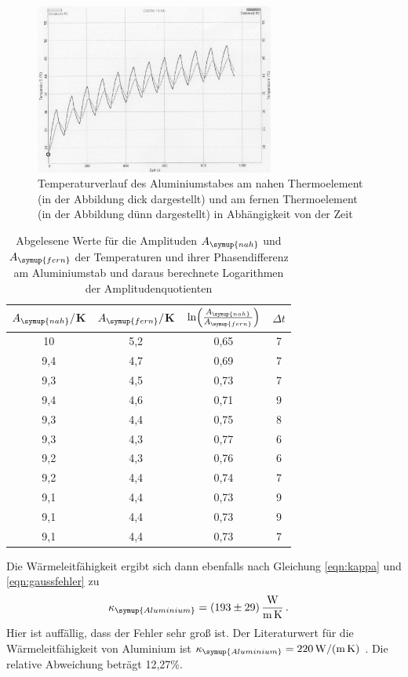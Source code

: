 \begin{figure}
  \centering
  \includegraphics[width=0.7\textwidth]{data/t5undt6_welle.JPEG}
  \caption{Temperaturverlauf des Aluminiumstabes am nahen Thermoelement (in der Abbildung dick dargestellt)
  und am fernen Thermoelement (in der Abbildung dünn dargestellt) in Abhängigkeit von der Zeit}
  \label{fig:aluminium_welle}
\end{figure}

\begin{table}
  \centering
  \caption{Abgelesene Werte für die Amplituden $A_{\symup{nah}}$ und $A_{\symup{fern}}$ der Temperaturen und
  ihrer Phasendifferenz am Aluminiumstab und daraus berechnete Logarithmen der Amplitudenquotienten}
  \label{tab:aluminium_welle}
  \begin{tabular}{c c c c}
    \toprule
     $A_{\symup{nah}}/$K  & $A_{\symup{fern}}/$K & $\ln\Bigl(\frac{A_{\symup{nah}}}{A_{\symup{fern}}}\Bigr)$ & $\Delta t$ \\
    \midrule
    10  	& 5,2  &  0,65 &  7 \\
    9,4	  & 4,7	 &  0,69 &  7 \\
    9,3	  & 4,5	 &  0,73 &  7 \\
    9,4	  & 4,6	 &  0,71 &  9 \\
    9,3	  & 4,4	 &  0,75 &  8 \\
    9,3	  & 4,3	 &  0,77 &  6 \\
    9,2	  & 4,3	 &  0,76 &  6 \\
    9,2	  & 4,4	 &  0,74 &  7 \\
    9,1	  & 4,4	 &  0,73 &  9 \\
    9,1	  & 4,4	 &  0,73 &  9 \\
    9,1	  & 4,4	 &  0,73 &  7 \\
    \bottomrule
  \end{tabular}
\end{table}
Die Wärmeleitfähigkeit ergibt sich dann ebenfalls nach Gleichung \eqref{eqn:kappa}
und \eqref{eqn:gaussfehler} zu
\begin{align}
  \kappa_{\symup{Aluminium}} &= \SI{193(29)}{\watt\per\meter\per\kelvin}\,.\nonumber
\end{align}
Hier ist auffällig, dass der Fehler sehr groß ist.
Der Literaturwert für die Wärmeleitfähigkeit von Aluminium ist
$\kappa_{\symup{Aluminium}} = \SI{220}{\watt\per\meter\per\kelvin}$ \cite{Wärmeleitfähigkeit1}. Die relative
Abweichung beträgt 12,27\%.


